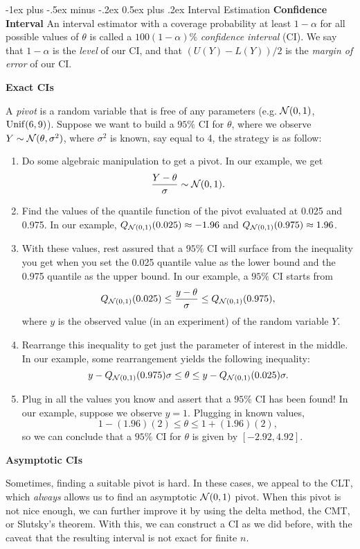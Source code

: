 \documentclass[10pt,landscape]{article}
\makeatletter
\renewcommand{\section}{\@startsection{section}{1}{0mm}%
                                {-1ex plus -.5ex minus -.2ex}%
                                {0.5ex plus .2ex}%
                                {\normalfont\large\bfseries}}
\makeatother
\begin{document}
\begin{multicols*}{3}
\section{Interval Estimation}
\textbf{Confidence Interval}
An interval estimator with a coverage probability at least $1-\alpha$ for all possible values of $\theta$ is called a $100(1-\alpha)\%$ \emph{confidence interval} (CI). We say that $1-\alpha$ is the \emph{level} of our CI, and that $(U(Y)-L(Y))/2$ is the \emph{margin of error} of our CI.

\textbf{Exact CIs}

A \emph{pivot} is a random variable that is free of any parameters (e.g. $\mathcal{N}(0,1)$, $\operatorname{Unif}(6,9)$). Suppose we want to build a $95\%$ CI for $\theta$, where we observe $Y\sim \mathcal{N}(\theta,\sigma^2)$, where $\sigma^2$ is known, say equal to 4, the strategy is as follow:

\begin{enumerate}
    \item Do some algebraic manipulation to get a pivot. In our example, we get $$\frac{Y-\theta}{\sigma}\sim \mathcal{N}(0,1).$$
    \item Find the values of the quantile function of the pivot evaluated at 0.025 and 0.975. In our example, $Q_{\mathcal{N}(0,1)}(0.025)\approx -1.96$ and $Q_{\mathcal{N}(0,1)}(0.975)\approx 1.96$.
    \item With these values, rest assured that a $95\%$ CI will surface from the inequality you get when you set the 0.025 quantile value as the lower bound and the 0.975 quantile as the upper bound. In our example, a $95\%$ CI starts from $$Q_{\mathcal{N}(0,1)}(0.025)\leq \frac{y-\theta}{\sigma}\leq Q_{\mathcal{N}(0,1)}(0.975),$$ where $y$ is the observed value (in an experiment) of the random variable $Y$.
    \item Rearrange this inequality to get just the parameter of interest in the middle. In our example, some rearrangement yields the following inequality: $$y-Q_{\mathcal{N}(0,1)}(0.975)\sigma\leq \theta\leq y-Q_{\mathcal{N}(0,1)}(0.025)\sigma.$$
    \item Plug in all the values you know and assert that a $95\%$ CI has been found! In our example, suppose we observe $y=1$. Plugging in known values, $$1-(1.96)(2)\leq \theta \leq 1+(1.96)(2),$$ so we can conclude that a $95\%$ CI for $\theta$ is given by $[-2.92,4.92]$. 
\end{enumerate}

\textbf{Asymptotic CIs}

Sometimes, finding a suitable pivot is hard. In these cases, we appeal to the CLT, which \emph{always} allows us to find an asymptotic $\mathcal{N}(0,1)$ pivot. When this pivot is not nice enough, we can further improve it by using the delta method, the CMT, or Slutsky's theorem. With this, we can construct a CI as we did before, with the caveat that the resulting interval is not exact for finite $n$.


\end{multicols*}
\end{document}

